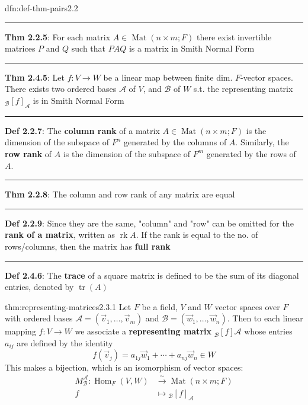 \documentclass[landscape, 8pt]{extarticle}
\DeclareMathOperator{\Mat}{Mat}
\DeclareMathOperator{\Hom}{Hom}
\DeclareMathOperator{\rk}{rk}
\DeclareMathOperator{\Tr}{tr}
\begin{document}
\begin{multicols}{3}
\begin{dfn}{dfn:def-thm-pairs}{2.2}
    \vspace{-5pt}
    \noindent\rule{\textwidth}{0.2pt}
    \textbf{Thm 2.2.5}: For each matrix $A\in \Mat(n \times m; F)$ there exist invertible matrices $P$ and $Q$ such that $PAQ$ is a matrix in Smith Normal Form
    
    \vspace{-5pt}
    \noindent\rule{\textwidth}{0.2pt}
    \textbf{Thm 2.4.5}: Let $f : V \to W$ be a linear map between finite dim. $F$-vector spaces. There exists two ordered bases $\mathcal{A}$ of $V$, and $\mathcal{B}$ of $W$ s.t. the representing matrix ${}_{\mathcal{B}}[f]_{\mathcal{A}}$ is in Smith Normal Form

    \noindent\rule{\textwidth}{0.6pt}
    \textbf{Def 2.2.7}: The \textbf{column rank} of a matrix $A\in \Mat(n \times m; F)$ is the dimension of the subspace of $F^{n}$ generated by the columns of $A$. Similarly, the \textbf{row rank} of $A$ is the dimension of the subspace of $F^{m}$ generated by the rows of $A$.

    \vspace{-5pt}
    \noindent\rule{\textwidth}{0.2pt}
    \textbf{Thm 2.2.8}: The column and row rank of any matrix are equal

    \noindent\rule{\textwidth}{0.6pt}
    \textbf{Def 2.2.9}: Since they are the same, "column" and "row" can be omitted for the \textbf{rank of a matrix}, written as $\rk A$. If the rank is equal to the no. of rows/columns, then the matrix has \textbf{full rank}

    \noindent\rule{\textwidth}{0.6pt}
    \textbf{Def 2.4.6}: The \textbf{trace} of a square matrix is defined to be the sum of its diagonal entries, denoted by $\Tr(A)$
\end{dfn}
\newpage

\begin{thm}{thm:representing-matrices}{2.3.1}
    Let $F$ be a field, $V$ and $W$ vector spaces over $F$ with ordered bases $\mathcal{A} = (\vec{v}_{1},\dots,\vec{v}_{m})$ and $\mathcal{B} = (\vec{w}_{1},\dots,\vec{w}_{n})$. Then to each linear mapping $f : V \to W$ we associate a \textbf{representing matrix} $_{\mathcal{B}}[f]\mathcal{A}$ whose entries $a_{ij}$ are defined by the identity
    \[f(\vec{v}_{j}) = a_{1j}\vec{w}_{1} + \cdots + a_{nj}\vec{w}_{n}\in W\]
    This makes a bijection, which is an isomorphism of vector spaces:
    \begin{align*}
        M^{\mathcal{A}}_{\mathcal{B}} : \Hom_{F}(V, W) &\xrightarrow{\sim} \Mat(n \times m; F) \\
        f &\mapsto {}_{\mathcal{B}}[f]_{\mathcal{A}}
    \end{align*}
\end{thm}


\end{multicols}
\end{document}
